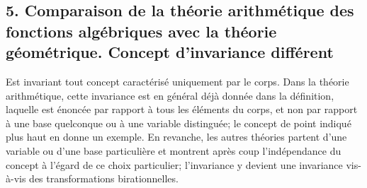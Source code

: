 \subsection*{5. Comparaison de la théorie arithmétique des fonctions algébriques avec la théorie géométrique. Concept d'invariance différent}

Est \og{}invariant\fg{} tout concept caractérisé uniquement par le corps. Dans la théorie arithmétique, cette invariance est en général déjà donnée dans la définition, laquelle est énoncée par rapport à tous les éléments du corps, et non par rapport à une base quelconque ou à une variable distinguée; le concept de point indiqué plus haut en donne un exemple. En revanche, les autres théories partent d'une variable ou d'une base particulière et montrent après coup l'indépendance du concept à l'égard de ce choix particulier; l'invariance y devient une invariance vis-à-vis des transformations birationnelles.

